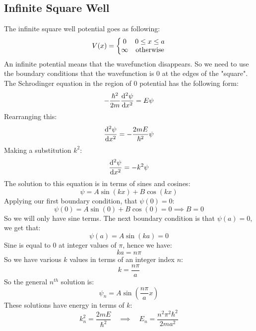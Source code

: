 \subsection{Infinite Square Well}
The infinite square well potential goes as following:
\begin{equation*}
  V(x)=\left\{\mqty{
    0 & 0 \leq x \leq a \\
    \infty & \text{otherwise}
  }\right.
\end{equation*}
An infinite potential means that the wavefunction disappears. So we need to use the boundary conditions that the wavefunction is $0$ at the edges of the "square". The Schrodinger equation in the region of $0$ potential has the following form:
\begin{equation*}
  -\dfrac{\hbar^2}{2m}\dv[2]{\psi}{x}=E\psi
\end{equation*}
Rearranging this:
\begin{equation*}
  \dv[2]{\psi}{x}=-\dfrac{2mE}{\hbar^2}\psi
\end{equation*}
Making a substitution $k^2$:
\begin{equation*}
  \dv[2]{\psi}{x}=-k^2\psi
\end{equation*}
The solution to this equation is in terms of sines and cosines:
\begin{equation*}
  \psi=A\sin(kx)+B\cos(kx)
\end{equation*}
Applying our first boundary condition, that $\psi(0)=0$:
\begin{equation*}
  \psi(0)=A\sin(0)+B\cos(0)=0 \implies B=0
\end{equation*}
So we will only have sine terms. The next boundary condition is that $\psi(a)=0$, we get that:
\begin{equation*}
  \psi(a)=A\sin(ka)=0
\end{equation*}
Sine is equal to $0$ at integer values of $\pi$, hence we have:
\begin{equation*}
  ka=n\pi
\end{equation*}
So we have various $k$ values in terms of an integer index $n$:
\begin{equation*}
  k=\dfrac{n\pi}{a}
\end{equation*}
So the general $n^{th}$ solution is:
\begin{equation*}
  \psi_n=A\sin(\dfrac{n\pi}{a}x)
\end{equation*}
These solutions have energy in terms of $k$:
\begin{equation*}
  k_n^2=\dfrac{2mE}{\hbar^2} \quad\implies\quad E_n=\dfrac{n^2\pi^2\hbar^2}{2ma^2}
\end{equation*}
